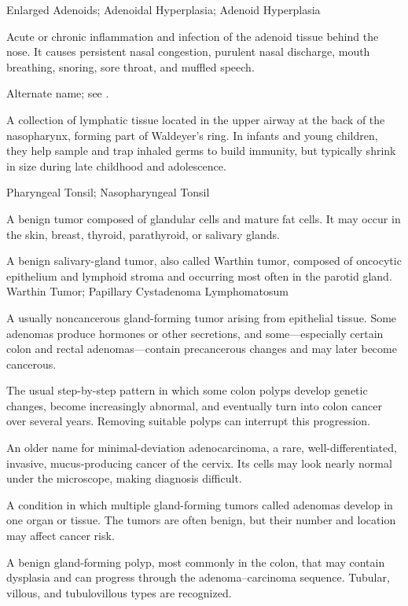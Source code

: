 \synonyms
Enlarged Adenoids; Adenoidal Hyperplasia; Adenoid Hyperplasia

 Acute or chronic inflammation and infection of the adenoid tissue behind the nose. It causes persistent nasal congestion, purulent nasal discharge, mouth breathing, snoring, sore throat, and muffled speech.

 Alternate name; see .

 A collection of lymphatic tissue located in the upper airway at the back of the nasopharynx, forming part of Waldeyer's ring. In infants and young children, they help sample and trap inhaled germs to build immunity, but typically shrink in size during late childhood and adolescence.

\synonyms
Pharyngeal Tonsil; Nasopharyngeal Tonsil

 A benign tumor composed of glandular cells and mature fat cells. It may occur in the skin, breast, thyroid, parathyroid, or salivary glands.

 A benign salivary-gland tumor, also called Warthin tumor, composed of oncocytic epithelium and lymphoid stroma and occurring most often in the parotid gland.
\synonyms
Warthin Tumor; Papillary Cystadenoma Lymphomatosum

 A usually noncancerous gland-forming tumor arising from epithelial tissue. Some adenomas produce hormones or other secretions, and some—especially certain colon and rectal adenomas—contain precancerous changes and may later become cancerous.

 The usual step-by-step pattern in which some colon polyps develop genetic changes, become increasingly abnormal, and eventually turn into colon cancer over several years. Removing suitable polyps can interrupt this progression.

 An older name for minimal-deviation adenocarcinoma, a rare, well-differentiated, invasive, mucus-producing cancer of the cervix. Its cells may look nearly normal under the microscope, making diagnosis difficult.

 A condition in which multiple gland-forming tumors called adenomas develop in one organ or tissue. The tumors are often benign, but their number and location may affect cancer risk.

 A benign gland-forming polyp, most commonly in the colon, that may contain dysplasia and
can progress through the adenoma--carcinoma sequence. Tubular, villous, and
tubulovillous types are recognized.

